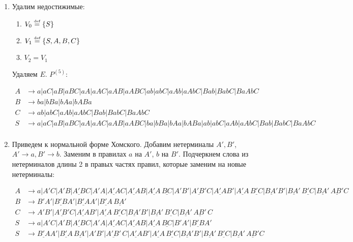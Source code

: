 \documentclass[a4paper]{article}
\def\eqdef{\overset{\mbox{\tiny def}}{=}}
\begin{document}
\begin{enumerate}
\item Удалим недостижимые:\begin{enumerate}
\item $V_0\eqdef\{S\}$
\item $V_1\eqdef\{S,A,B,C\}$
\item $V_2=V_1$
\end{enumerate}
Удаляем $E$. $P^{(5)}$:
\vspace{-7ex}
\begin{multicols}{2}
	\begin{align*}
		A &\to a|aC|aB|aBC|aA|aAC|aAB|aABC|ab|abC|aAb|aAbC|Bab|BabC|BaAbC\\
		B &\to ba|bBa|bAa|bABa\\
		C &\to ab|abC|aAb|aAbC|Bab|BabC|BaAbC\\
		S &\to a|aC|aB|aBC|aA|aAC|aAB|aABC|ba|bBa|bAa|bABa|ab|abC|aAb|aAbC|Bab|BabC|BaAbC\\
	\end{align*}	
\end{multicols}
\vspace{-7ex}
\item Приведем к нормальной форме Хомского. Добавим нетерминалы $A',B'$, $A'\to a,B'\to b$. Заменим в правилах $a$ на $A'$, $b$ на $B'$. Подчеркнем слова из нетерминалов длины 2 в правых частях правил, которые заменим на новые нетерминалы:
\vspace{-7ex}
\begin{multicols}{2}
	\begin{align*}
		A &\to a|A'C|A'B|\underline{A'B}C|A'A|\underline{A'A}C|\underline{A'A}B|\underline{A'A}\,\underline{BC}|A'B'|\underline{A'B'}C|\underline{A'A}B'|\underline{A'A}\,\underline{B'C}|\underline{BA'}B'|\underline{BA'}\,\underline{B'C}|\underline{BA'}\,\underline{AB'}C\\
		B &\to B'A'|\underline{B'B}A'|\underline{B'A}A'|\underline{B'A}\,\underline{BA'}\\
		C &\to A'B'|\underline{A'B'}C|\underline{A'A}B'|\underline{A'A}\,\underline{B'C}|\underline{BA'}B'|\underline{BA'}\,\underline{B'C}|\underline{BA'}\,\underline{AB'}\,C\\
		S &\to a|A'C|A'B|\underline{A'B}C|A'A|\underline{A'A}C|\underline{A'A}B|\underline{A'A}\,\underline{BC}|B'A'|\underline{B'B}A'\\
		S &\to \underline{B'A}A'|\underline{B'A}\,\underline{BA'}|A'B'|\underline{A'B'}\,C|\underline{A'A}B'|\underline{A'A}\,\underline{B'C}|\underline{BA'}B'|\underline{BA'}\,\underline{B'C}|\underline{BA'}\,\underline{AB'}C\\			

\end{align*}
\end{multicols}
\end{enumerate}
\end{document}
